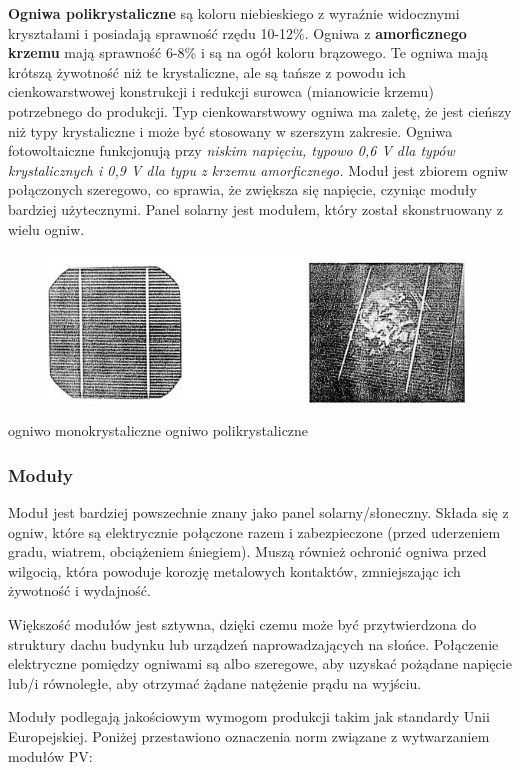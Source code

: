 \documentclass[12pt,a4paper]{article}
\begin{document}
\textbf{Ogniwa polikrystaliczne} są koloru niebieskiego z wyraźnie widocznymi 
kryształami i posiadają sprawność rzędu 10-12\%. Ogniwa z \textbf{amorficznego 
krzemu} mają sprawność 6-8\% i są na ogół koloru brązowego. Te ogniwa 
mają krótszą żywotność niż te krystaliczne, ale są tańsze z powodu ich 
cienkowarstwowej konstrukcji i redukcji surowca (mianowicie krzemu) 
potrzebnego do produkcji. Typ cienkowarstwowy ogniwa ma zaletę, że 
jest cieńszy niż typy krystaliczne i może być stosowany w szerszym 
zakresie. 
Ogniwa fotowoltaiczne funkcjonują przy \textit{niskim napięciu, typowo 0,6 V dla 
typów krystalicznych i 0,9 V dla typu z krzemu amorficznego.} Moduł jest 
zbiorem ogniw połączonych szeregowo, co sprawia, że zwiększa się 
napięcie, czyniąc moduły bardziej użytecznymi. Panel solarny jest 
modułem, który został skonstruowany z wielu ogniw. 

\begin{figure}[h]
\centering
\includegraphics[natwidth=14.65cm,natheight=5.17cm]{media/image5.jpg}
\end{figure}
 ogniwo monokrystaliczne ogniwo polikrystaliczne 

\subsubsection{Moduły}
Moduł jest bardziej powszechnie znany jako panel 
solarny/słoneczny. Składa się z ogniw, które są elektrycznie połączone 
razem i zabezpieczone (przed uderzeniem gradu, wiatrem, obciążeniem 
śniegiem). Muszą również ochronić ogniwa przed wilgocią, która powoduje 
korozję metalowych kontaktów, zmniejszając ich żywotność i wydajność. 

Większość modułów jest sztywna, dzięki czemu może być przytwierdzona do 
struktury dachu budynku lub urządzeń naprowadzających na słońce. 
Połączenie elektryczne pomiędzy ogniwami są albo szeregowe, aby uzyskać 
pożądane napięcie lub/i równoległe, aby otrzymać żądane natężenie prądu 
na wyjściu. 

Moduły podlegają jakościowym wymogom produkcji takim jak standardy Unii 
Europejskiej. Poniżej przestawiono oznaczenia norm związane z wytwarzaniem modułów PV:  
\end{document}

